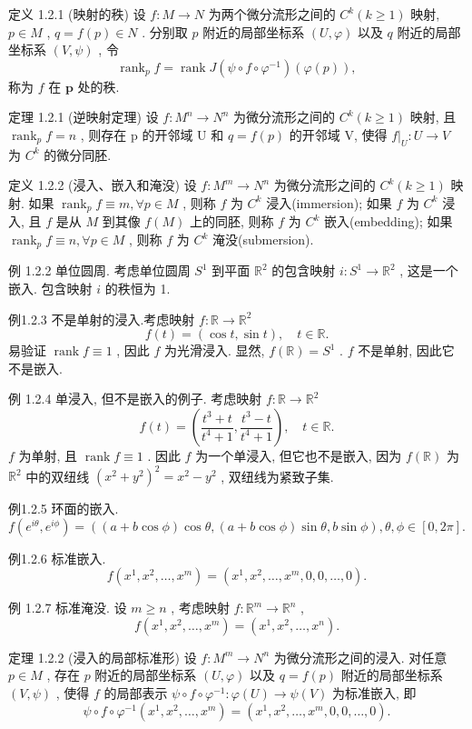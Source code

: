 \documentclass[]{article}
\begin{document}
定义 1.2.1 (映射的秩) 设 $f: M \to N$ 为两个微分流形之间的 $C^k (k \geqslant 1)$ 映射, $p \in M$ , $q = f(p) \in N$ . 分别取 $p$ 附近的局部坐标系 $(U, \varphi)$ 以及 $q$ 附近的局部坐标系 $(V, \psi)$ , 令 $$
\operatorname{rank} _ {p} f = \operatorname{rank} J (\psi \circ f \circ \varphi^ {- 1}) (\varphi (p)),
$$称为 $f$ 在 $\pmb{p}$ 处的秩. 

定理 1.2.1 (逆映射定理) 设 $f: M^{n} \rightarrow N^{n}$ 为微分流形之间的 $C^{k} (k \geqslant 1)$ 映射, 且 $\operatorname{rank}_{p} f = n$ , 则存在 p 的开邻域 U 和 $q = f(p)$ 的开邻域 V, 使得 $f|_{U}: U \rightarrow V$ 为 $C^{k}$ 的微分同胚. 

定义 1.2.2 (浸入、嵌入和淹没) 设 $f: M^m \to N^n$ 为微分流形之间的 $C^k (k \geqslant 1)$ 映射. 如果 $\operatorname{rank}_p f \equiv m, \forall p \in M$ , 则称 $f$ 为 $C^k$ 浸入(immersion); 如果 $f$ 为 $C^k$ 浸入, 且 $f$ 是从 $M$ 到其像 $f(M)$ 上的同胚, 则称 $f$ 为 $C^k$ 嵌入(embedding); 如果 $\operatorname{rank}_p f \equiv n, \forall p \in M$ , 则称 $f$ 为 $C^k$ 淹没(submersion). 

例 1.2.2 单位圆周. 考虑单位圆周 $S^1$ 到平面 $\mathbb{R}^2$ 的包含映射 $i: S^1 \to \mathbb{R}^2$ , 这是一个嵌入. 包含映射 $i$ 的秩恒为 1. 

例1.2.3 不是单射的浸入.考虑映射 $f:\mathbb{R}\to \mathbb{R}^2$  
$$
f (t) = (\cos t, \sin t), \quad t \in \mathbb {R}.
$$
易验证 $\operatorname{rank} f \equiv 1$ , 因此 $f$ 为光滑浸入. 显然, $f(\mathbb{R}) = S^1$ . $f$ 不是单射, 因此它不是嵌入. 

例 1.2.4 单浸入, 但不是嵌入的例子. 
考虑映射 $f:\mathbb{R}\to \mathbb{R}^2$ $$
f (t) = \left(\frac {t ^ {3} + t}{t ^ {4} + 1}, \frac {t ^ {3} - t}{t ^ {4} + 1}\right), \quad t \in \mathbb {R}.
$$
$f$ 为单射, 且 $\operatorname{rank} f \equiv 1$ . 因此 $f$ 为一个单浸入, 但它也不是嵌入, 因为 $f(\mathbb{R})$ 为 $\mathbb{R}^2$ 中的双纽线 $(x^2 + y^2)^2 = x^2 - y^2$ , 双纽线为紧致子集. 

例1.2.5 环面的嵌入. $$
f (e ^ {i \theta}, e ^ {i \phi}) = ((a + b \cos \phi) \cos \theta , (a + b \cos \phi) \sin \theta , b \sin \phi), \theta , \phi \in [ 0, 2 \pi ].
$$

例1.2.6 标准嵌入. $$
f (x ^ {1}, x ^ {2}, \dots , x ^ {m}) = (x ^ {1}, x ^ {2}, \dots , x ^ {m}, 0, 0, \dots , 0).
$$

例 1.2.7 标准淹没. 设 $m \geqslant n$ , 考虑映射 $f: \mathbb{R}^m \to \mathbb{R}^n$ , $$
f (x ^ {1}, x ^ {2}, \dots , x ^ {m}) = (x ^ {1}, x ^ {2}, \dots , x ^ {n}).
$$

定理 1.2.2 (浸入的局部标准形) 设 $f: M^{m} \to N^{n}$ 为微分流形之间的浸入. 对任意 $p \in M$ , 存在 $p$ 附近的局部坐标系 $(U, \varphi)$ 以及 $q = f(p)$ 附近的局部坐标系 $(V, \psi)$ , 使得 $f$ 的局部表示 $\psi \circ f \circ \varphi^{-1}: \varphi(U) \to \psi(V)$ 为标准嵌入, 即 $$
\psi \circ f \circ \varphi^ {- 1} (x ^ {1}, x ^ {2}, \dots , x ^ {m}) = (x ^ {1}, x ^ {2}, \dots , x ^ {m}, 0, 0, \dots , 0).
$$
\end{document}
